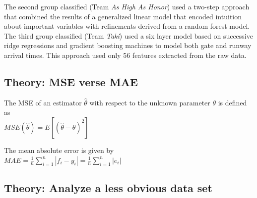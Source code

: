 \documentclass{vldb}
\begin{document}
	The second group classified (Team \textit{As High As Honor}) used a two-step approach that combined the results of a generalized linear model that encoded intuition about important variables with refinements derived from a random forest model.
	The third group classified (Team \textit{Taki}) used a six layer model based on successive ridge regressions and gradient boosting machines to model both gate and runway arrival times.
	This approach used only 56 features extracted from the raw data.
		
	
	
	\subsection{Theory: MSE verse MAE}
	The MSE of an estimator $\hat{\theta}$ with respect to the unknown parameter $\theta$ is defined as\\ $MSE(\hat{\theta})=E[(\hat{\theta}-\theta)^2]$
		
	The mean absolute error is given by\\ $MAE=\frac{1}{n}\sum_{i=1}^n \left | f_i - y_i \right | = \frac{1}{n}\sum_{i=1}^n \left | e_i \right |$
	\subsection{Theory: Analyze a less obvious data set}
	
\begin{thebibliography}{99}

	
	
	
\end{thebibliography}	
		
\end{document}
